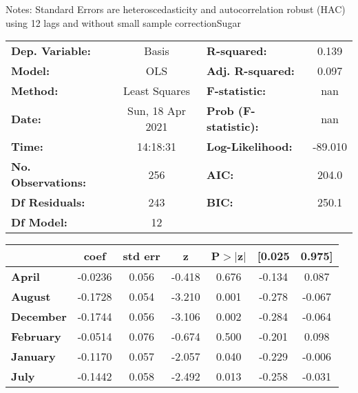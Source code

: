 Notes: \newline
 [1] Standard Errors are heteroscedasticity and autocorrelation robust (HAC) using 12 lags and without small sample correctionSugar\begin{center}
\begin{tabular}{lclc}
\toprule
\textbf{Dep. Variable:}    &      Basis       & \textbf{  R-squared:         } &     0.139   \\
\textbf{Model:}            &       OLS        & \textbf{  Adj. R-squared:    } &     0.097   \\
\textbf{Method:}           &  Least Squares   & \textbf{  F-statistic:       } &       nan   \\
\textbf{Date:}             & Sun, 18 Apr 2021 & \textbf{  Prob (F-statistic):} &      nan    \\
\textbf{Time:}             &     14:18:31     & \textbf{  Log-Likelihood:    } &   -89.010   \\
\textbf{No. Observations:} &         256      & \textbf{  AIC:               } &     204.0   \\
\textbf{Df Residuals:}     &         243      & \textbf{  BIC:               } &     250.1   \\
\textbf{Df Model:}         &          12      & \textbf{                     } &             \\
\bottomrule
\end{tabular}
\begin{tabular}{lcccccc}
                   & \textbf{coef} & \textbf{std err} & \textbf{z} & \textbf{P$> |$z$|$} & \textbf{[0.025} & \textbf{0.975]}  \\
\midrule
\textbf{April}     &      -0.0236  &        0.056     &    -0.418  &         0.676        &       -0.134    &        0.087     \\
\textbf{August}    &      -0.1728  &        0.054     &    -3.210  &         0.001        &       -0.278    &       -0.067     \\
\textbf{December}  &      -0.1744  &        0.056     &    -3.106  &         0.002        &       -0.284    &       -0.064     \\
\textbf{February}  &      -0.0514  &        0.076     &    -0.674  &         0.500        &       -0.201    &        0.098     \\
\textbf{January}   &      -0.1170  &        0.057     &    -2.057  &         0.040        &       -0.229    &       -0.006     \\
\textbf{July}      &      -0.1442  &        0.058     &    -2.492  &         0.013        &       -0.258    &       -0.031     \\

\end{tabular}
\end{center}
